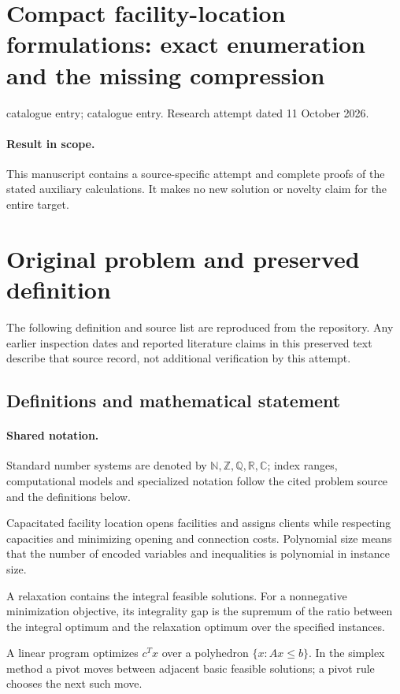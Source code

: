 \documentclass[11pt]{article}
\begin{document}
\section*{Compact facility-location formulations: exact enumeration and the missing compression}
\noindent catalogue entry; catalogue entry. Research attempt dated 11 October 2026.
\paragraph{Result in scope.}This manuscript contains a source-specific attempt and complete proofs of the stated auxiliary calculations. It makes no new solution or novelty claim for the entire target.
\section{Original problem and preserved definition}
The following definition and source list are reproduced from the repository. Any earlier inspection dates and reported literature claims in this preserved text describe that source record, not additional verification by this attempt.
\subsection{Definitions and mathematical statement}

\paragraph{Shared notation.}Standard number systems are denoted by $\mathbb N,\mathbb Z,\mathbb Q,\mathbb R,\mathbb C$; index ranges, computational models and specialized notation follow the cited problem source and the definitions below.


Capacitated facility location opens facilities and assigns clients while respecting capacities and minimizing opening and connection costs. Polynomial size means that the number of encoded variables and inequalities is polynomial in instance size.

A relaxation contains the integral feasible solutions. For a nonnegative minimization objective, its integrality gap is the supremum of the ratio between the integral optimum and the relaxation optimum over the specified instances.

A linear program optimizes $c^Tx$ over a polyhedron $\{x:Ax\leq b\}$. In the simplex method a pivot moves between adjacent basic feasible solutions; a pivot rule chooses the next such move.
\end{document}
